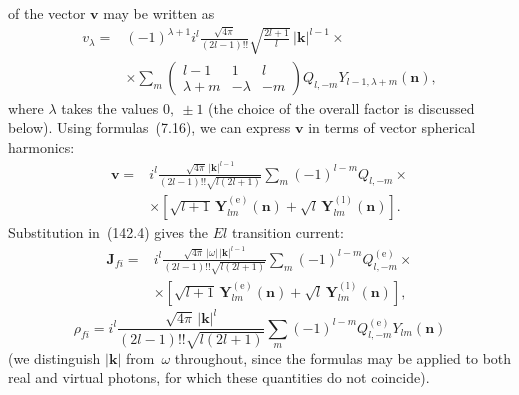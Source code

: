 of the vector $\mathbf v$ may be written as
\[
\begin{aligned}
v_\lambda={}&(-1)^{\lambda+1}i^l\frac{\sqrt{4\pi}}{(2l-1)!!}
\sqrt{\frac{2l+1}{l}}\,|\mathbf k|^{l-1}\times{}\\
&\times\sum_m
\begin{pmatrix}
l-1&1&l\\
\lambda+m&-\lambda&-m
\end{pmatrix}
Q_{l,-m}Y_{l-1,\lambda+m}(\mathbf n),
\end{aligned}
\]
where $\lambda$ takes the values $0,\ \pm1$ (the choice of the overall factor is discussed below). Using formulas~(7.16), we can express $\mathbf v$ in terms of vector spherical harmonics:
\begin{equation}
\begin{aligned}
\mathbf v={}&i^l\frac{\sqrt{4\pi}\,|\mathbf k|^{l-1}}
{(2l-1)!!\sqrt{l(2l+1)}}\sum_m(-1)^{l-m}Q_{l,-m}\times{}\\
&\times\left[\sqrt{l+1}\,\mathbf Y_{lm}^{(\mathrm e)}(\mathbf n)
+\sqrt l\,\mathbf Y_{lm}^{(\mathrm l)}(\mathbf n)\right].
\end{aligned}
\tag{142.6}
\end{equation}
Substitution in~(142.4) gives the $El$ transition current:
\begin{equation}
\begin{aligned}
\mathbf J_{fi}={}&i^l\frac{\sqrt{4\pi}\,|\omega|\,|\mathbf k|^{l-1}}
{(2l-1)!!\sqrt{l(2l+1)}}\sum_m(-1)^{l-m}Q_{l,-m}^{(\mathrm e)}\times{}\\
&\times\left[\sqrt{l+1}\,\mathbf Y_{lm}^{(\mathrm e)}(\mathbf n)
+\sqrt l\,\mathbf Y_{lm}^{(\mathrm l)}(\mathbf n)\right],
\end{aligned}
\tag{142.7}
\end{equation}
\begin{equation}
\rho_{fi}=i^l\frac{\sqrt{4\pi}\,|\mathbf k|^l}
{(2l-1)!!\sqrt{l(2l+1)}}
\sum_m(-1)^{l-m}Q_{l,-m}^{(\mathrm e)}Y_{lm}(\mathbf n)
\tag{142.8}
\end{equation}
(we distinguish $|\mathbf k|$ from~$\omega$ throughout, since the formulas may be applied to both real and virtual photons, for which these quantities do not coincide).

